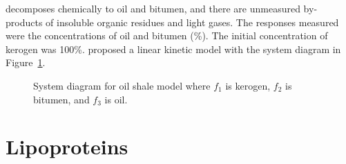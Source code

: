 decomposes chemically to oil and bitumen, and there are
unmeasured by-products of insoluble organic residues and light
gases.
The responses measured were the concentrations of oil and
bitumen (\%).
The initial concentration of kerogen was 100\%.
 proposed a linear kinetic model with
the system diagram in Figure~\ref{fig:oil}.

\begin{figure}
  \centerline{\box\graph}
  \caption{\label{fig:oil}
  System diagram for oil shale model where $f_{1}$ is kerogen, $f_{2}$
  is bitumen, and $f_{3}$ is oil.}
\end{figure}

\section{Lipoproteins}

